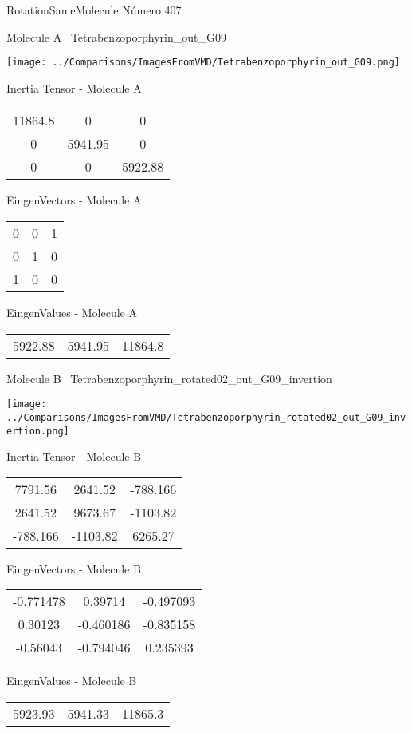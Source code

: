 \vtab[-3cm]
\begin{center}
{\large RotationSameMolecule \tab Número 407}
\end{center}
\begin{multicols}{2}
\begin{center}

Molecule A \
Tetrabenzoporphyrin\_out\_G09

\texttt{[image: ../Comparisons/ImagesFromVMD/Tetrabenzoporphyrin\_out\_G09.png]}

Inertia Tensor - Molecule A \\
\begin{tabular}{|c c c|}
11864.8	 & 	0	 & 	0	 \\
0	 & 	5941.95	 & 	0	 \\
0	 & 	0	 & 	5922.88
\end{tabular}

\vtab
 EingenVectors - Molecule A     \\
\begin{tabular}{|c c c|}
0	 & 	0	 & 	1	 \\
0	 & 	1	 & 	0	 \\
1	 & 	0	 & 	0
\end{tabular}

\vtab
 EingenValues - Molecule A     \\
\begin{tabular}{|c c c|}
5922.88	 & 	5941.95	 & 	11864.8	 \\
\end{tabular}
\columnbreak

Molecule B \
Tetrabenzoporphyrin\_rotated02\_out\_G09\_invertion

\texttt{[image: ../Comparisons/ImagesFromVMD/Tetrabenzoporphyrin\_rotated02\_out\_G09\_invertion.png]}

Inertia Tensor - Molecule B \\
\begin{tabular}{|c c c|}
7791.56	 & 	2641.52	 & 	-788.166	 \\
2641.52	 & 	9673.67	 & 	-1103.82	 \\
-788.166	 & 	-1103.82	 & 	6265.27
\end{tabular}

\vtab
 EingenVectors - Molecule B     \\
\begin{tabular}{|c c c|}
-0.771478	 & 	0.39714	 & 	-0.497093	 \\
0.30123	 & 	-0.460186	 & 	-0.835158	 \\
-0.56043	 & 	-0.794046	 & 	0.235393
\end{tabular}

\vtab
 EingenValues - Molecule B     \\
\begin{tabular}{|c c c|}
5923.93	 & 	5941.33	 & 	11865.3	 \\
\end{tabular}

\end{center}
\end{multicols}

